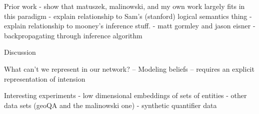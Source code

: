 \documentclass[11pt,letterpaper]{article}
\begin{document}
Prior work
- show that matuszek, malinowski, and my own work largely fits in this paradigm
- explain relationship to Sam's (stanford) logical semantics thing
- explain relationship to mooney's inference stuff.
- matt gormley and jason eisner - backpropagating through inference algorithm

Discussion

What can't we represent in our network?
-- Modeling beliefs -- requires an explicit representation of intension


Interesting experiments
- low dimensional embeddings of sets of entities
- other data sets (geoQA and the malinowski one)
- synthetic quantifier data
\end{document}
